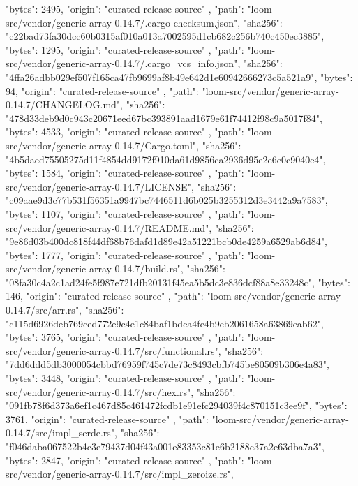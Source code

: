 {{      "bytes": 2495,
      "origin": "curated-release-source"
    },
    {
      "path": "loom-src/vendor/generic-array-0.14.7/.cargo-checksum.json",
      "sha256": "c22bad73fa30dcc60b0315af010a013a7002595d1cb682c256b740c450ec3885",
      "bytes": 1295,
      "origin": "curated-release-source"
    },
    {
      "path": "loom-src/vendor/generic-array-0.14.7/.cargo_vcs_info.json",
      "sha256": "4ffa26adbb029ef507f165ca47fb9699af8b49e642d1e60942666273c5a521a9",
      "bytes": 94,
      "origin": "curated-release-source"
    },
    {
      "path": "loom-src/vendor/generic-array-0.14.7/CHANGELOG.md",
      "sha256": "478d33deb9d0c943c20671eed67bc393891aad1679e61f74412f98c9a5017f84",
      "bytes": 4533,
      "origin": "curated-release-source"
    },
    {
      "path": "loom-src/vendor/generic-array-0.14.7/Cargo.toml",
      "sha256": "4b5daed75505275d11f4854dd9172f910da61d9856ca2936d95e2e6e0c9040e4",
      "bytes": 1584,
      "origin": "curated-release-source"
    },
    {
      "path": "loom-src/vendor/generic-array-0.14.7/LICENSE",
      "sha256": "c09aae9d3c77b531f56351a9947bc7446511d6b025b3255312d3e3442a9a7583",
      "bytes": 1107,
      "origin": "curated-release-source"
    },
    {
      "path": "loom-src/vendor/generic-array-0.14.7/README.md",
      "sha256": "9e86d03b400dc818f44df68b76dafd1d89e42a51221bcb0de4259a6529ab6d84",
      "bytes": 1777,
      "origin": "curated-release-source"
    },
    {
      "path": "loom-src/vendor/generic-array-0.14.7/build.rs",
      "sha256": "08fa30c4a2c1ad24fe5f987e721dfb20131f45ea5b5dc3e836dcf88a8e33248c",
      "bytes": 146,
      "origin": "curated-release-source"
    },
    {
      "path": "loom-src/vendor/generic-array-0.14.7/src/arr.rs",
      "sha256": "c115d6926deb769ced772e9c4e1c84baf1bdea4fe4b9eb2061658a63869eab62",
      "bytes": 3765,
      "origin": "curated-release-source"
    },
    {
      "path": "loom-src/vendor/generic-array-0.14.7/src/functional.rs",
      "sha256": "7dd6ddd5db3000054cbbd76959f745c7de73c8493cbfb745be80509b306e4a83",
      "bytes": 3448,
      "origin": "curated-release-source"
    },
    {
      "path": "loom-src/vendor/generic-array-0.14.7/src/hex.rs",
      "sha256": "091fb78f6d373a6ef1c467d85c461472fcdb1e91efc294039f4c870151c3ee9f",
      "bytes": 3761,
      "origin": "curated-release-source"
    },
    {
      "path": "loom-src/vendor/generic-array-0.14.7/src/impl_serde.rs",
      "sha256": "f046daba067522b4c3e79437d04f43a001e83353c81e6b2188c37a2e63dba7a3",
      "bytes": 2847,
      "origin": "curated-release-source"
    },
    {
      "path": "loom-src/vendor/generic-array-0.14.7/src/impl_zeroize.rs",
}}
